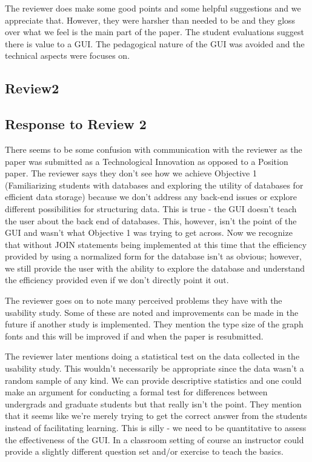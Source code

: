 \documentclass[11pt]{tise_style}
\begin{document}
The reviewer does make some good points and some helpful suggestions and we appreciate that.  However, they were harsher than needed to be and they gloss over what we feel is the main part of the paper.  The student evaluations suggest there is value to a GUI.  The pedagogical nature of the GUI was avoided and the technical aspects were focuses on.

\subsection{Review2}



\subsection{Response to Review 2}

There seems to be some confusion with communication with the reviewer as the paper was submitted as a Technological Innovation as opposed to a Position paper.  The reviewer says they don't see how we achieve Objective 1 (Familiarizing students with databases and exploring the utility of databases for efficient data
storage) because we don't address any back-end issues or explore different possibilities for structuring data.  This is true - the GUI doesn't teach the user about the back end of databases.  This, however, isn't the point of the GUI and wasn't what Objective 1 was trying to get across.  Now we recognize that without JOIN statements being implemented at this time that the efficiency provided by using a normalized form for the database isn't as obvious; however, we still provide the user with the ability to explore the database and understand the efficiency provided even if we don't directly point it out.

The reviewer goes on to note many perceived problems they have with the usability study.  Some of these are noted and improvements can be made in the future if another study is implemented.  They mention the type size of the graph fonts and this will be improved if and when the paper is resubmitted.

The reviewer later mentions doing a statistical test on the data collected in the usability study.  This wouldn't necessarily be appropriate since the data wasn't a random sample of any kind.  We can provide descriptive statistics and one could make an argument for conducting a formal test for differences between undergrads and graduate students but that really isn't the point.  They mention that it seems like we're merely trying to get the correct answer from the students instead of facilitating learning.  This is silly - we need to be quantitative to assess the effectiveness of the GUI.  In a classroom setting of course an instructor could provide a slightly different question set and/or exercise to teach the basics.
\end{document}
